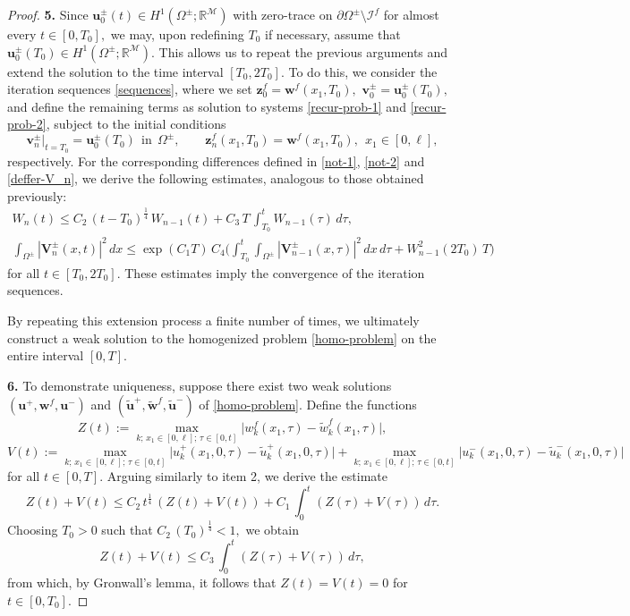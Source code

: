 \documentclass[reqno]{amsart}            %
\numberwithin{equation}{section}
\begin{document}
\begin{proof}
		\smallskip
		\noindent
		{\bf 5.}
		Since $\mathbf{u}^\pm_0(t) \in H^1(\Omega^\pm; \mathbb{R}^\mathcal{M})$ with zero-trace on $\partial\Omega^\pm \setminus \mathcal{I}^f$ for almost every $t \in [0, T_0],$ we may, upon redefining $T_0$ if necessary, assume that $\mathbf{u}^\pm_0(T_0) \in H^1(\Omega^\pm; \mathbb{R}^\mathcal{M}).$ This allows us to repeat the previous arguments and extend the solution to the time interval $[T_0, 2 T_0].$ To do this,
		we consider the iteration sequences \eqref{sequences}, where we set  
		$\mathbf{z}^f_0 = \mathbf{w}^f(x_1, T_0),$ $\mathbf{v}^\pm_0 = \mathbf{u}^\pm_0(T_0),$
		and define the remaining terms as solution to systems \eqref{recur-prob-1} and \eqref{recur-prob-2}, subject to the initial conditions 
		$$
		\mathbf{v}^\pm_{n} \big|_{t=T_0}  =  \mathbf{u}^\pm_0(T_0) \ \  \text{in} \ \ \Omega^\pm, \qquad
		\mathbf{z}^f_n(x_1,T_0)= \mathbf{w}^f(x_1, T_0), \ \ x_1\in [0, \ell],
		$$
		respectively. 
		For the corresponding differences defined in \eqref{not-1}, \eqref{not-2} and \eqref{deffer-V_n}, 
		we derive the following estimates, analogous to those obtained previously:
		\begin{gather*}
			W_n(t) \le C_2 \, (t - T_0)^{\frac{1}{4}} \, W_{n-1}(t) + C_3 \, T \, \int_{T_0}^{t} W_{n-1}(\tau)\, d\tau,
			\\ 
			\int_{\Omega^\pm} |\mathbf{V}^\pm_n(x,t)|^2\, dx \le \exp(C_1 T) \, C_4 \Big(\int_{T_0}^{t}\int_{\Omega^\pm} |\mathbf{V}^\pm_{n-1}(x,\tau)|^2 \, dx\, d\tau + W^2_{n-1}(2 T_0) \, T \Big) 
		\end{gather*}
		for all $t \in [T_0, 2 T_0].$ These estimates imply the convergence of the iteration sequences.
		
		By repeating this extension process a finite number of times, we ultimately construct a weak solution to the homogenized problem \eqref{homo-problem} on the entire interval $[0, T].$  
		
		\smallskip
		\noindent
		{\bf 6.} To demonstrate uniqueness, suppose there exist two weak solutions  $(\mathbf{u}^+, \mathbf{w}^f, \mathbf{u}^-)$
		and $(\tilde{\mathbf{u}}^+, \tilde{\mathbf{w}}^f, \tilde{\mathbf{u}}^-)$ of \eqref{homo-problem}. 
		Define  the functions
		\begin{equation*}%
			Z(t) := \max_{k;\, x_1\in [0,\ell];\, \tau\in [0, t]} \big|w^f_{k}(x_1, \tau) - \tilde{w}^f_{k}(x_1, \tau)\big|,
		\end{equation*}
		$$
		V(t) :=  \max_{k; \,x_1\in [0,\ell]; \, \tau\in [0, t]} \big|u^+_{k}(x_1, 0, \tau) - \tilde{u}^+_{k}(x_1, 0, \tau)\big|
		+
		\max_{k;\, x_1\in [0,\ell]; \, \tau\in [0, t]} \big|u^-_{k}(x_1, 0, \tau) - \tilde{u}^-_{k}(x_1, 0, \tau)\big|
		$$
		for all $t\in [0,T].$
		Arguing similarly to item 2, we derive the estimate
		$$
		Z(t) + V(t) \le C_2 \, t^{\frac{1}{4}} \, \left(Z(t) + V(t)\right) + C_1 \, \int_{0}^{t} \left(Z(\tau) + V(\tau)\right)\, d\tau.
		$$
		Choosing $T_0 > 0$ such that $C_2\, (T_0)^{\frac{1}{4}} < 1,$ we obtain 
		$$
		Z(t) + V(t) \le C_3 \, \int_{0}^{t} \left(Z(\tau) + V(\tau)\right)\, d\tau,
		$$
		from which, by Gronwall's lemma, it follows that $Z(t) = V(t) = 0$ for $t\in [0,T_0].$
		

\end{proof}
\end{document}
